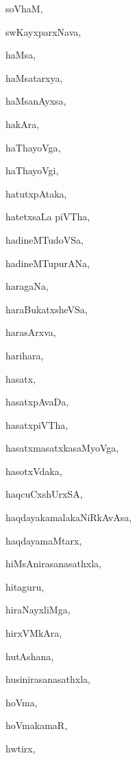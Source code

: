 \begin{multicols}{2}
{soVhaM}, \pageref{soVhaM}

{swKayxparxNava}, \pageref{swKayxparxNava}

{haMsa}, \pageref{haMsa}

{haMsatarxya}, \pageref{haMsatarxya}

{haMsanAyxsa}, \pageref{haMsanAyxsa}

{hakAra}, \pageref{hakAra}

{haThayoVga}, \pageref{haThayoVga}

{haThayoVgi}, \pageref{haThayoVgi}

{hatutxpAtaka}, \pageref{hatutxpAtaka}

{hatetxsaLa piVTha}, \pageref{hatetxsaLapiVTha}

{hadineMTudoVSa}, \pageref{hadineMTudoVSa}

{hadineMTupurANa}, \pageref{hadineMTupurANa}

{haragaNa}, \pageref{haragaNa}

{haraBukatxsheVSa}, \pageref{haraBukatxsheVSa}

{harasArxva}, \pageref{harasArxva}

{harihara}, \pageref{harihara}

{hasatx}, \pageref{hasatx}

{hasatxpAvaDa}, \pageref{hasatxpAvaDa}

{hasatxpiVTha}, \pageref{hasatxpiVTha}

{hasatxmasatxkasaMyoVga}, \pageref{hasatxmasatxkasaMyoVga}

{hasotxVdaka}, \pageref{hasotxVdaka}

{haqcuCxshUrxSA}, \pageref{haqcuCxshUrxSA}

{haqdayakamalakaNiRkAvAsa}, \pageref{haqdayakamalakaNiRkAvAsa}

{haqdayamaMtarx}, \pageref{haqdayamaMtarx}

{hiMsAnirasanasathxla}, \pageref{hiMsAnirasanasathxla}

{hitaguru}, \pageref{hitaguru}

{hiraNayxliMga}, \pageref{hiraNayxliMga}

{hirxVMkAra}, \pageref{hirxVMkAra}

{hutAshana}, \pageref{hutAshana}

{husinirasanasathxla}, \pageref{husinirasanasathxla}

{hoVma}, \pageref{hoVma}

{hoVmakamaR}, \pageref{hoVmakamaR}

{hwtirx}, \pageref{hwtirx}

\end{multicols}
